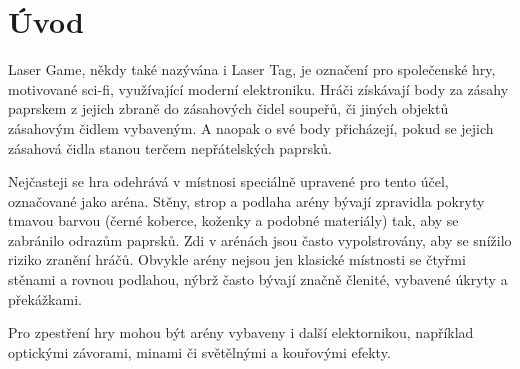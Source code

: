 \chapter*{Úvod}
{}

Laser Game, někdy také nazývána i Laser Tag, je označení pro společenské hry, motivované sci-fi, využívající moderní elektroniku. Hráči získávají body za zásahy  paprskem z jejich zbraně do zásahových čidel soupeřů, či jiných objektů zásahovým čidlem vybaveným. A naopak o své body přicházejí, pokud se jejich zásahová čidla stanou terčem nepřátelských  paprsků.

Nejčasteji se hra odehrává v místnosi speciálně upravené pro tento účel, označované jako aréna. Stěny, strop a podlaha arény bývají zpravidla pokryty tmavou barvou (černé koberce, koženky a podobné materiály) tak, aby se zabránilo odrazům  paprsků. Zdi v arénách jsou často vypolstrovány, aby se snížilo riziko zranění hráčů. Obvykle arény nejsou jen klasické místnosti se čtyřmi stěnami a rovnou podlahou, nýbrž často bývají značně členité, vybavené úkryty a překážkami.

Pro zpestření hry mohou být arény vybaveny i další elektornikou, například optickými závorami, minami či světělnými a kouřovými efekty.
